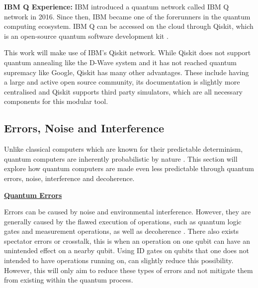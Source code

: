 \textbf{IBM Q Experience:} IBM introduced a quantum network called IBM Q network in 2016. Since then, IBM became one of the forerunners in the quantum computing ecosystem. IBM Q can be accessed on the cloud through Qiskit, which is an open-source quantum software development kit \citep{QCloudC}.

This work will make use of IBM’s Qiskit network. While Qiskit does not support quantum annealing like the D-Wave system and it has not reached quantum supremacy like Google, Qiskit has many other advantages. These include having a large and active open source community, its documentation is slightly more centralised and Qiskit supports third party simulators, which are all necessary components for this modular tool.


\subsection{Errors, Noise and Interference} \label{NoiseErrInter}
Unlike classical computers which are known for their predictable determinism, quantum computers are inherently probabilistic by nature \citep{ERNIStar}. This section will explore how quantum computers are made even less predictable through quantum errors, noise, interference and decoherence. 

\vspace{0.4cm}
\textbf{\underline{Quantum Errors}}\label{ERNoi}

Errors can be caused by noise and environmental interference. However, they are generally caused by the flawed execution of operations, such as quantum logic gates and measurement operations, as well as decoherence \citep{ERNIStar}.
There also exists spectator errors or crosstalk, this is when an operation on one qubit can have an unintended effect on a nearby qubit. Using ID gates on qubits that one does not intended to have operations running on, can slightly reduce this possibility. However, this will only aim to reduce these types of errors and not mitigate them from existing within the quantum process.




